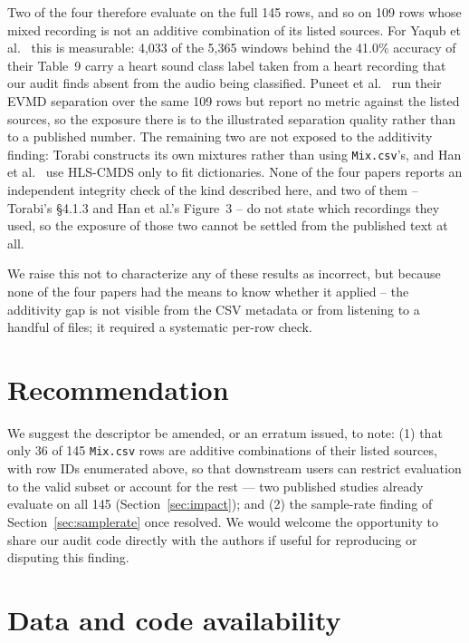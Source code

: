 \documentclass[11pt]{article}
\begin{document}
Two of the four therefore evaluate on the full 145 rows, and so on 109 rows
whose mixed recording is not an additive combination of its listed sources.
For Yaqub et al.\ \cite{spectrotemporal} this is measurable: 4{,}033 of the
5{,}365 windows behind the 41.0\% accuracy of their Table~9 carry a heart
sound class label taken from a heart recording that our audit finds absent
from the audio being classified. Puneet et al.\ \cite{edgelung} run their
EVMD separation over the same 109 rows but report no metric against the
listed sources, so the exposure there is to the illustrated separation
quality rather than to a published number. The remaining two are not
exposed to the additivity finding: Torabi \cite{aidriven} constructs its own
mixtures rather than using \texttt{Mix.csv}'s, and Han et al.\
\cite{nmfcrnn} use HLS-CMDS only to fit dictionaries. None of the four
papers reports an independent integrity check of the kind described here,
and two of them -- Torabi's \S4.1.3 and Han et al.'s Figure~3 -- do not
state which recordings they used, so the exposure of those two cannot be
settled from the published text at all.

We raise this not to characterize any of these results as incorrect, but
because none of the four papers had the means to know whether it applied --
the additivity gap is not visible from the CSV metadata or from listening
to a handful of files; it required a systematic per-row check.

\section{Recommendation}

We suggest the descriptor be amended, or an erratum issued, to note: (1)
that only 36 of 145 \texttt{Mix.csv} rows are additive combinations of their
listed sources, with row IDs enumerated above, so that downstream users can
restrict evaluation to the valid subset or account for the rest --- two
published studies already evaluate on all 145
(Section~\ref{sec:impact}); and (2)
the sample-rate finding of Section~\ref{sec:samplerate} once resolved. We
would welcome the opportunity to share our audit code directly with the
authors if useful for reproducing or disputing this finding.

\section{Data and code availability}
\label{sec:availability}
\end{document}
